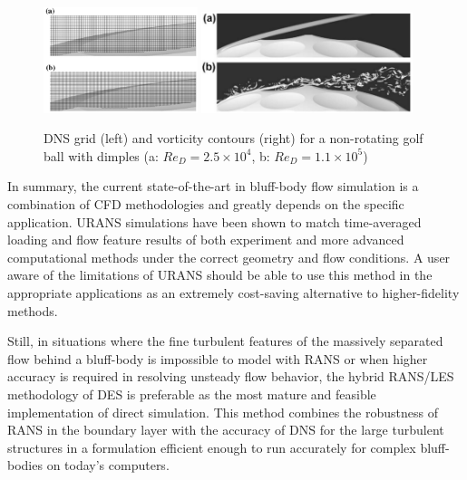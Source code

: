 \documentclass[journal]{new-aiaa}
\begin{document}
\begin{figure}[H]
\begin{center}
\includegraphics[width=0.40\textwidth]{Images/logan/smith2010numerical_golfballgrid.pdf}
\includegraphics[width=0.55\textwidth]{Images/logan/smith2010numerical_golfballvorticity.pdf}
\caption{ DNS grid (left) and vorticity contours (right) for a non-rotating golf ball with dimples (a: $Re_D = 2.5\times10^4$, b: $Re_D=1.1\times10^5$) \cite{smith2010numerical} }
\label{fig:dnsgolfball}
\end{center}
\end{figure}















In summary, the current state-of-the-art in bluff-body flow simulation is a combination of CFD methodologies and greatly depends on the specific application. URANS simulations have been shown to match time-averaged loading and flow feature results of both experiment and more advanced computational methods under the correct geometry and flow conditions. A user aware of the limitations of URANS should be able to use this method in the appropriate applications as an extremely cost-saving alternative to higher-fidelity methods.

Still, in situations where the fine turbulent features of the massively separated flow behind a bluff-body is impossible to model with RANS or when higher accuracy is required in resolving unsteady flow behavior, the hybrid RANS/LES methodology of DES is preferable as the most mature and feasible implementation of direct simulation. This method combines the robustness of RANS in the boundary layer with the accuracy of DNS for the large turbulent structures in a formulation efficient enough to run accurately for complex bluff-bodies on today's computers.
\end{document}
